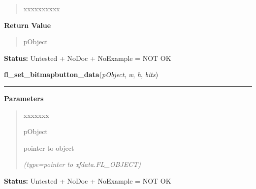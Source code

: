 \begin{boxedminipage}{\funcwidth}
\begin{quote}
\begin{Ventry}{xxxxxxxxxx}
        \end{Ventry}

      \end{quote}

      \textbf{Return Value}
    \vspace{-1ex}

      \begin{quote}
      pObject

      \end{quote}

\textbf{Status:} Untested + NoDoc + NoExample = NOT OK



    \end{boxedminipage}

    \label{xformslib:library:fl_set_bitmapbutton_data}

    \vspace{0.5ex}

\hspace{.8\funcindent}\begin{boxedminipage}{\funcwidth}

    \raggedright \textbf{fl\_set\_bitmapbutton\_data}(\textit{pObject}, \textit{w}, \textit{h}, \textit{bits})

    \vspace{-1.5ex}

    \rule{\textwidth}{0.5\fboxrule}
\setlength{\parskip}{2ex}
\setlength{\parskip}{1ex}
      \textbf{Parameters}
      \vspace{-1ex}

      \begin{quote}
        \begin{Ventry}{xxxxxxx}

          \item[pObject]

          pointer to object

            {\it (type=pointer to xfdata.FL\_OBJECT)}

        \end{Ventry}

      \end{quote}

\textbf{Status:} Untested + NoDoc + NoExample = NOT OK



    \end{boxedminipage}


